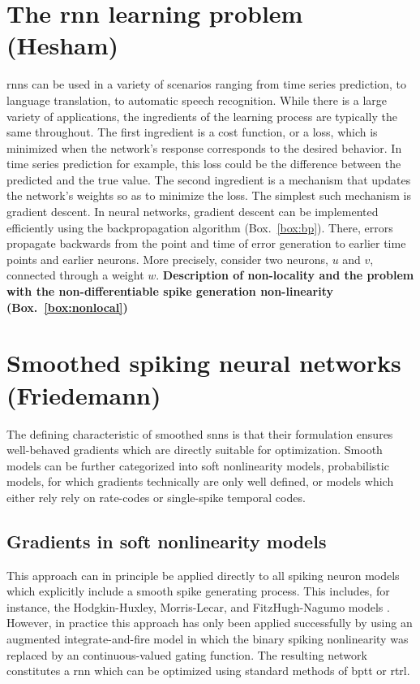 \documentclass[journal,onecolumn,11pt]{IEEEtran}
\newcommand{\refbox}[1]{{\color{blue!70}(Box.~\ref{#1})}}
\begin{document}
\section{The \gls{rnn} learning problem (Hesham)}
\glspl{rnn} can be used in a variety of scenarios ranging from time series prediction, to language translation, to automatic speech recognition.
While there is a large variety of applications, the ingredients of the learning process are typically the same throughout.
The first ingredient is a cost function, or a loss, which is minimized when the network's response corresponds to the desired behavior.
In time series prediction for example, this loss could be the difference between the predicted and the true value.
The second ingredient is a mechanism that updates the network's weights so as to minimize the loss.
The simplest such mechanism is gradient descent.
In neural networks, gradient descent can be implemented efficiently using the backpropagation algorithm \refbox{box:bp}.
There, errors propagate backwards from the point and time of error generation to earlier time points and earlier neurons.
More precisely, consider two neurons, $u$ and $v$, connected through a weight $w$.
{\bf Description of non-locality and the problem with the non-differentiable spike generation non-linearity \refbox{box:nonlocal}}



\section{Smoothed spiking neural networks (Friedemann)}

The defining characteristic of smoothed \glspl{snn} is that their formulation ensures well-behaved gradients which are directly suitable for optimization.
Smooth models can be further categorized into soft nonlinearity models, probabilistic models, for which gradients technically are only well defined, or models which either rely rely on rate-codes or
single-spike temporal codes.  

\subsection{Gradients in soft nonlinearity models}

This approach can in principle be applied
directly to all spiking neuron models which explicitly include a smooth spike
generating process. This includes, for instance,  the Hodgkin-Huxley,
Morris-Lecar, and FitzHugh-Nagumo models \cite{Gerstner_etal14_neurdyna}.
However, in practice this approach has only been applied successfully by
\cite{Huh_Sejnowski17_graddesc} using an augmented integrate-and-fire model in
which the binary spiking nonlinearity was replaced by an continuous-valued
gating function.  The resulting network constitutes a \gls{rnn} which can be
optimized using standard methods of \gls{bptt} or \gls{rtrl}.  
\end{document}
